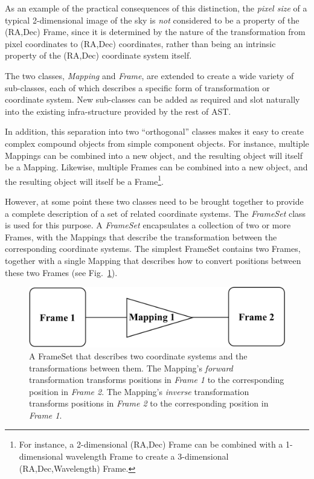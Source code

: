 \documentclass[final,authoryear,5p,times,twocolumn]{elsarticle}
\begin{document}
As an example of the practical consequences of this distinction,
the \emph{pixel size} of a typical 2-dimensional image of the sky is
\emph{not} considered to be a property of the (RA,Dec) Frame, since it is
determined by the nature of the transformation from pixel coordinates to
(RA,Dec) coordinates, rather than being an intrinsic property of the (RA,Dec)
coordinate system itself.

The two classes, \emph{Mapping} and \emph{Frame}, are extended
to create a wide variety of sub-classes, each of which describes a
specific form of transformation or coordinate system. New sub-classes can
be added as required and slot naturally into the existing
infra-structure provided by the rest of AST.

In addition, this separation into two ``orthogonal'' classes makes it
easy to create complex compound objects from simple component objects.
For instance, multiple Mappings can be combined into a new object, and
the resulting object will itself be a Mapping. Likewise, multiple Frames
can be combined into a new object, and the resulting object will itself be
a Frame\footnote{For instance, a 2-dimensional (RA,Dec) Frame can be
combined with a 1-dimensional wavelength Frame to create a 3-dimensional
(RA,Dec,Wavelength) Frame.}.

However, at some point these two classes need to be brought together to
provide a complete description of a set of related coordinate systems.
The \emph{FrameSet} class is used for this purpose. A \emph{FrameSet}
encapsulates a collection of two or more Frames, with the Mappings that
describe the transformation between the corresponding coordinate systems.
The simplest FrameSet contains two Frames, together with a single Mapping that
describes how to convert positions between these two Frames (see
Fig.~\ref{fig:simple-frameset}).

\begin{figure}[h]
\centering
\includegraphics[width=0.5\columnwidth]{simple-frameset}
\caption{A FrameSet that describes two coordinate systems and the
transformations between them. The Mapping's \emph{forward} transformation
transforms positions in \emph{Frame 1} to the corresponding position in
\emph{Frame 2}. The Mapping's \emph{inverse} transformation
transforms positions in \emph{Frame 2} to the corresponding position in
\emph{Frame 1}. }
\label{fig:simple-frameset}
\end{figure}
\end{document}
